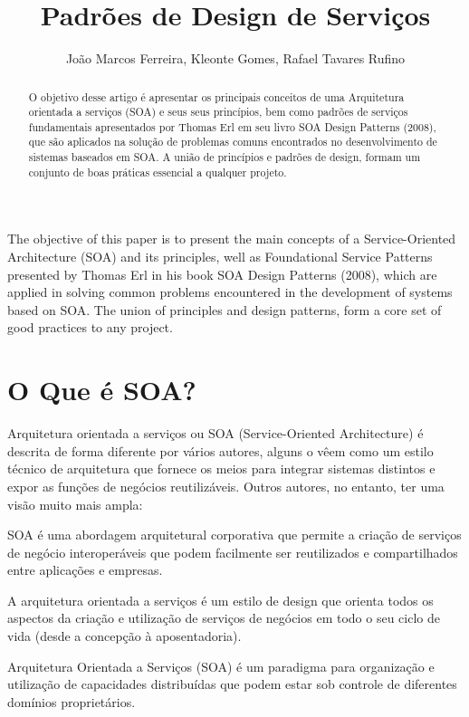 \documentclass[12pt]{article}
\title{Padrões de Design de Serviços}
\author{João Marcos Ferreira\inst{1}, Kleonte Gomes\inst{2}, Rafael Tavares Rufino\inst{3} }
\begin{document}
 

\maketitle

\begin{abstract}
O objetivo desse artigo é apresentar os principais conceitos de uma Arquitetura orientada a serviços (SOA) e seus seus princípios, bem como padrões de serviços fundamentais apresentados por Thomas Erl em seu livro SOA Design Patterns (2008), que são aplicados na solução de problemas comuns encontrados no desenvolvimento de sistemas baseados em SOA. A união de princípios e padrões de design, formam um conjunto de boas práticas essencial a qualquer projeto.   
\end{abstract}
   
\begin{resumo} 
The objective of this paper is to present the main concepts of a Service-Oriented Architecture (SOA) and its principles, well as Foundational Service Patterns presented by Thomas Erl in his book SOA Design Patterns (2008), which are applied in solving common problems encountered in the development of systems based on SOA. The union of principles and design patterns, form a core set of good practices to any project.
\end{resumo}


\section{O Que é SOA?}

Arquitetura orientada a serviços ou SOA (Service-Oriented Architecture) é descrita de forma diferente por vários autores, alguns o vêem como um estilo técnico de arquitetura que fornece os meios para integrar sistemas distintos e expor as funções de negócios reutilizáveis. Outros autores, no entanto, ter uma visão muito mais ampla:

SOA é uma abordagem arquitetural corporativa que permite a criação de serviços de negócio interoperáveis que podem facilmente ser reutilizados e compartilhados entre aplicações e empresas.

A arquitetura orientada a serviços é um estilo de design que orienta todos os aspectos da criação e utilização de serviços de negócios em todo o seu ciclo de vida (desde a concepção à aposentadoria). %

Arquitetura Orientada a Serviços (SOA) é um paradigma para organização e utilização de capacidades distribuídas que podem estar sob controle de diferentes domínios proprietários. %
\end{document}
